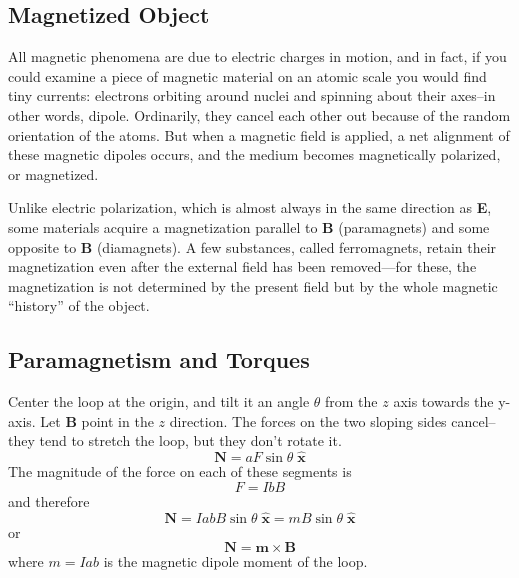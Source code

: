 \documentclass[../../../main.tex]{subfiles}
\begin{document}
\subsection{Magnetized Object}
All magnetic phenomena are due to electric charges in motion, and in fact, if you could examine a piece of magnetic material on an atomic scale you would ﬁnd tiny currents: electrons orbiting around nuclei and spinning about their axes--in other words, dipole. Ordinarily, they cancel each other out because of the random orientation of the atoms. But when a magnetic ﬁeld is applied, a net alignment of these magnetic dipoles occurs, and the medium becomes magnetically polarized, or magnetized. 

Unlike electric polarization, which is almost always in the same direction as \textbf{E}, some materials acquire a magnetization parallel to \textbf{B} (paramagnets) and some opposite to \textbf{B} (diamagnets). A few substances, called ferromagnets, retain their magnetization even after the external ﬁeld has been removed—for these, the magnetization is not determined by the present ﬁeld but by the whole magnetic “history” of the object.

\subsection{Paramagnetism and Torques}
Center the loop at the origin, and tilt it an angle $\theta$ from the $z$ axis towards the y-axis. Let \textbf{B} point in the $z$ direction. The forces on the two sloping sides cancel--they tend to stretch the loop, but they don’t rotate it. 
\begin{equation*}
    \mathbf{N} = aF \sin \theta\; \mathbf{\hat{x}}
\end{equation*}
The magnitude of the force on each of these segments is
\begin{equation*}
    F = I bB
\end{equation*}
and therefore
\begin{equation*}
    \mathbf{N} = I abB \sin \theta\; \mathbf{\hat{x}}=mB\sin\theta\;\mathbf{\hat{x}}
\end{equation*}
or
\begin{equation*}
    \mathbf{N}=\mathbf{m}\times\mathbf{B}
\end{equation*}
where $m = I ab$ is the magnetic dipole moment of the loop. 
\begin{figure}[b]
    \centering
\end{figure}
\end{document}
